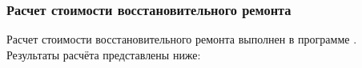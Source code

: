 %		
%
%
%
%

%
\subsubsection*{Расчет стоимости восстановительного ремонта}
\par Расчет стоимости восстановительного ремонта выполнен в программе \auda.\\
\indent Результаты расчёта представлены ниже:
%

